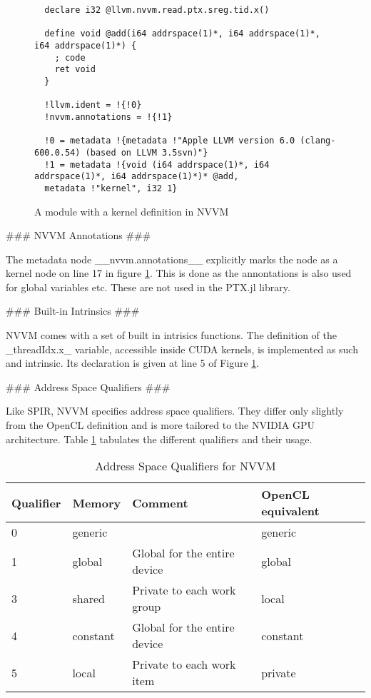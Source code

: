 \begin{markdown}
\begin{figure}[H]
\begin{verbatim}
  declare i32 @llvm.nvvm.read.ptx.sreg.tid.x()
  
  define void @add(i64 addrspace(1)*, i64 addrspace(1)*, i64 addrspace(1)*) {
    ; code
    ret void
  }
  
  !llvm.ident = !{!0}
  !nvvm.annotations = !{!1}
  
  !0 = metadata !{metadata !"Apple LLVM version 6.0 (clang-600.0.54) (based on LLVM 3.5svn)"}
  !1 = metadata !{void (i64 addrspace(1)*, i64 addrspace(1)*, i64 addrspace(1)*)* @add,
  metadata !"kernel", i32 1}
  \end{verbatim}
  \caption{A module with a kernel definition in NVVM}
  \label{fig:nvvm}
\end{figure}

### NVVM Annotations ###

The metadata node __nvvm.annotations__ explicitly marks the node as a
kernel node on line 17 in figure \ref{fig:nvvm}. This is done as the
annontations is also used for global variables etc. These are not used
in the PTX.jl library.

### Built-in Intrinsics ###

NVVM comes with a set of built in intrisics functions. The
definition of the _threadIdx.x_ variable, accessible inside \gls{CUDA}
kernels, is implemented as such and intrinsic. Its declaration is
given at line 5 of Figure \ref{fig:nvvm}.

### Address Space Qualifiers ###

Like \gls{SPIR}, NVVM specifies address space qualifiers. They
differ only slightly from the OpenCL definition and is more tailored
to the NVIDIA GPU architecture. Table \ref{tab:nvvm:addr} tabulates
the different qualifiers and their usage.

\begin{table}[H]
  \centering
  \begin{tabular}{|l|l|l|l|}
    \hline
    Qualifier & Memory   & Comment                      & OpenCL equivalent \\
    \hline
0         & generic  &                   & generic  \\
1         & global   & Global for the entire device & global \\
3         & shared   & Private to each work group   & local \\
4         & constant & Global for the entire device & constant \\
5         & local    & Private to each work item    & private \\
    \hline
  \end{tabular}
  \caption{Address Space Qualifiers for NVVM}
  \label{tab:nvvm:addr}
\end{table}



\end{markdown}
